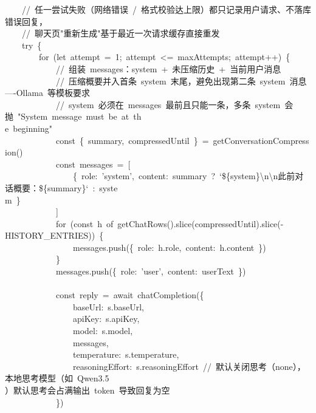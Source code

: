 \documentclass[a4paper,10pt]{article}
\begin{document}
{\ttfamily\footnotesize\raggedright
~~~~//~任一尝试失败（网络错误~/~格式校验达上限）都只记录用户请求、不落库错误回复，\\
~~~~//~聊天页"重新生成"基于最近一次请求缓存直接重发\\
~~~~try~\{\\
~~~~~~~~for~(let~attempt~=~1;~attempt~<=~maxAttempts;~attempt++)~\{\\
~~~~~~~~~~~~//~组装~messages：system~+~未压缩历史~+~当前用户消息\\
~~~~~~~~~~~~//~压缩概要并入首条~system~末尾，避免出现第二条~system~消息----Ollama~等模板要求\\
~~~~~~~~~~~~//~system~必须在~messages~最前且只能一条，多条~system~会抛~"System~message~must~be~at~th\\
e~beginning"\\
~~~~~~~~~~~~const~\{~summary,~compressedUntil~\}~=~getConversationCompression()\\
~~~~~~~~~~~~const~messages~=~[\\
~~~~~~~~~~~~~~~~\{~role:~'system',~content:~summary~?~`\$\{system\}\textbackslash{}n\textbackslash{}n此前对话概要：\$\{summary\}`~:~syste\\
m~\}\\
~~~~~~~~~~~~]\\
~~~~~~~~~~~~for~(const~h~of~getChatRows().slice(compressedUntil).slice(-HISTORY\_ENTRIES))~\{\\
~~~~~~~~~~~~~~~~messages.push(\{~role:~h.role,~content:~h.content~\})\\
~~~~~~~~~~~~\}\\
~~~~~~~~~~~~messages.push(\{~role:~'user',~content:~userText~\})\\
\mbox{}\\
~~~~~~~~~~~~const~reply~=~await~chatCompletion(\{\\
~~~~~~~~~~~~~~~~baseUrl:~s.baseUrl,\\
~~~~~~~~~~~~~~~~apiKey:~s.apiKey,\\
~~~~~~~~~~~~~~~~model:~s.model,\\
~~~~~~~~~~~~~~~~messages,\\
~~~~~~~~~~~~~~~~temperature:~s.temperature,\\
~~~~~~~~~~~~~~~~reasoningEffort:~s.reasoningEffort~//~默认关闭思考（none），本地思考模型（如~Qwen3.5\\
）默认思考会占满输出~token~导致回复为空\\
~~~~~~~~~~~~\})\\
\mbox{}\\
}
\end{document}
